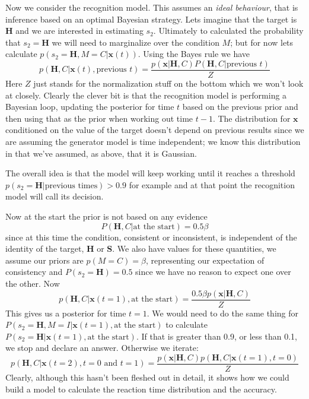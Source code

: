 \documentclass[12pt]{article}
\begin{document}
Now we consider the recognition model. This assumes an \textsl{ideal
  behaviour}, that is inference based on an optimal Bayesian
strategy. Lets imagine that the target is \textbf{H} and we are
interested in estimating $s_2$. Ultimately to calculated the
probability that $s_2=\mathbf{H}$ we will need to marginalize over the
condition $M$; but for now lets calculate
$p(s_2=\mathbf{H},M=C|\textbf{x}(t))$.  Using the Bayes rule we have
\begin{equation}
p(\mathbf{H},C|\textbf{x}(t),\mbox{previous $t$})=\frac{p(\textbf{x}|\mathbf{H},C)P(\mathbf{H},C|\mbox{previous $t$})}{Z}
\end{equation}
Here $Z$ just stands for the normalization stuff on the bottom which
we won't look at closely. Clearly the clever bit is that the
recognition model is performing a Bayesian loop, updating the
posterior for time $t$ based on the previous prior and then using that
as the prior when working out time $t-1$. The distribution for
$\mathbf{x}$ conditioned on the value of the target doesn't depend on
previous results since we are assuming the generator model is time
independent; we know this distribution in that we've assumed, as
above, that it is Gaussian.

The overall idea is that the model will keep working until it reaches
a threshold $p(s_2=\mathbf{H}|\mbox{previous times})>0.9$ for example
and at that point the recognition model will call its decision.

Now at the start the prior is not based on any evidence
\begin{equation}
P(\mathbf{H},C|\mbox{at the start})=0.5\beta
\end{equation}
since at this time the condition, consistent or inconsistent, is
independent of the identity of the target, \textbf{H} or \textbf{S}. We also have values for these quantities, we assume our priors are $p(M=C)=\beta$, representing our expectation of consistency and $P(s_2=\mathbf{H})=0.5$ since we have no reason to expect one over the other. Now
\begin{equation}
p(\mathbf{H},C|\textbf{x}(t=1),\mbox{at the start})=\frac{0.5\beta p(\textbf{x}|\mathbf{H},C)}{Z}
\end{equation}
This gives us a posterior for time $t=1$. We would need to do the same
thing for $P(s_2=\mathbf{H},M=I|\textbf{x}(t=1),\mbox{at the start})$
to calculate $P(s_2=\mathbf{H}|\textbf{x}(t=1),\mbox{at the
  start})$. If that is greater than 0.9, or less than 0.1, we stop and
declare an answer. Otherwise we iterate:
\begin{equation}
p(\mathbf{H},C|\textbf{x}(t=2),\mbox{$t=0$ and $t=1$})=\frac{p(\textbf{x}|\mathbf{H},C)p(\mathbf{H},C|\textbf{x}(t=1),t=0)}{Z}
\end{equation}
Clearly, although this hasn't been fleshed out in detail, it shows how
we could build a model to calculate the reaction time distribution and
the accuracy.
\end{document}

